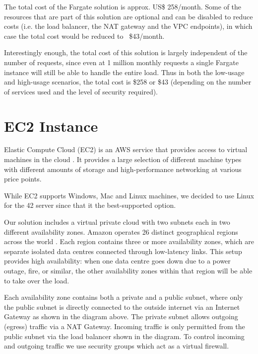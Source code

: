 The total cost of the Fargate solution is approx. US\$ 258/month. Some of the resources that are part of this solution are optional and can be disabled to reduce costs (i.e. the load balancer, the NAT gateway and the VPC endpoints), in which case the total cost would be reduced to ~\$43/month.

Interestingly enough, the total cost of this solution is largely independent of the number of requests, since even at 1 million monthly requests a single Fargate instance will still be able to handle the entire load. Thus in both the low-usage and high-usage scenarios, the total cost is \$258 or \$43 (depending on the number of services used and the level of security required).

\section{EC2 Instance}

Elastic Compute Cloud (EC2) is an AWS service that provides access to virtual machines in the cloud \cite{amazon-2022C}. It provides a large selection of different machine types with different amounts of storage and high-performance networking at various price points.

While EC2 supports Windows, Mac and Linux machines, we decided to use Linux for the 42 server since that it the best-supported option.


Our solution includes a virtual private cloud with two subnets each in two different availability zones. Amazon operates 26 distinct geographical regions across the world \cite{amazon-2022D}. Each region contains three or more availability zones, which are separate isolated data centres connected through low-latency links. This setup provides high availability: when one data centre goes down due to a power outage, fire, or similar, the other availability zones within that region will be able to take over the load.

Each availability zone contains both a private and a public subnet, where only the public subnet is directly connected to the outside internet via an Internet Gateway as shown in the diagram above. The private subnet allows outgoing (egress) traffic via a NAT Gateway. Incoming traffic is only permitted from the public subnet via the load balancer shown in the diagram. To control incoming and outgoing traffic we use security groups which act as a virtual firewall.

